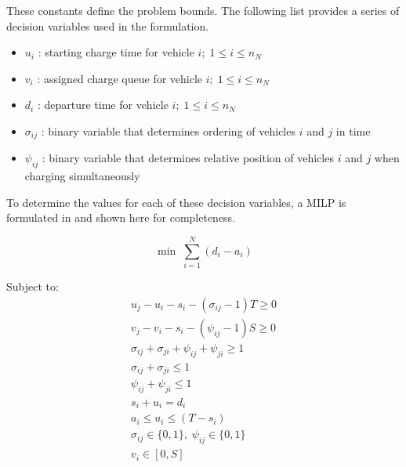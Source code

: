 \documentclass[ee,msthesis]{usuthesis}
\begin{document}
These constants define the problem bounds. The following list provides a series of decision variables used in the
formulation.

\begin{itemize}
    \item $u_i$    : starting charge time for vehicle $i;\; 1 \leq i \leq n_N$
    \item $v_i$    : assigned charge queue for vehicle $i;\; 1 \leq i \leq n_N$
    \item $d_i$    : departure time for vehicle $i;\; 1 \leq i \leq n_N$
    \item $\sigma_{ij}$ : binary variable that determines ordering of vehicles $i$ and $j$ in time
    \item $\psi_{ij}$ : binary variable that determines relative position of vehicles $i$ and $j$ when charging simultaneously
\end{itemize}

To determine the values for each of these decision variables, a MILP is formulated in \cite{qarebagh-2019-optim-sched}
and shown here for completeness.

\begin{equation}
	\label{eq:bapobjective}
	\min\; \sum_{i=1}^N (d_i - a_i)
\end{equation}

Subject to:
\begin{subequations}
\label{eq:bapconstrs}
\begin{align}
    u_j - u_i - s_i - (\sigma_{ij} - 1)T \geq 0                  \label{subeq:baptime}          \\
    v_j - v_i - s_i - (\psi_{ij} - 1)S \geq 0                \label{subeq:bapspace}           \\
    \sigma_{ij} + \sigma_{ji} + \psi_{ij} + \psi_{ji} \geq 1 \label{subeq:bapvalid_pos}     \\
    \sigma_{ij} + \sigma_{ji} \leq 1                              \label{subeq:bapsigma}        \\
    \psi_{ij} + \psi_{ji} \leq 1                              \label{subeq:bapdelta}        \\
    s_i + u_i = d_i                                               \label{subeq:bapdetach}       \\
    a_i \leq u_i \leq (T - s_i)                                   \label{subeq:bapvalid_starts} \\
    \sigma_{ij} \in \{0,1\},\;\psi_{ij} \in \{0,1\}\;           \label{subeq:bapsdspace}      \\
    v_i \in [0, S ]                                               \label{subeq:bapvspace}
\end{align}
\end{subequations}
\end{document}
